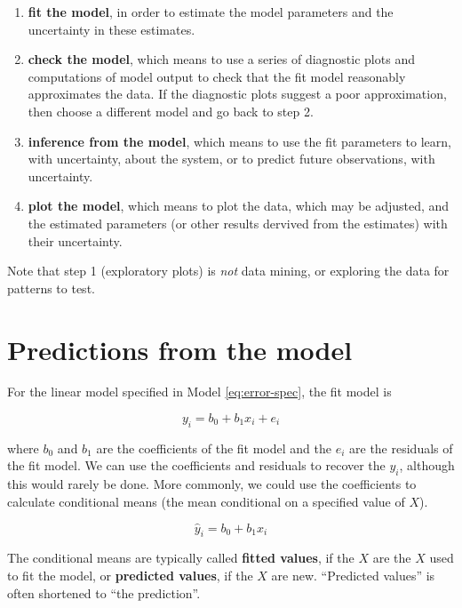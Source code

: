 \documentclass[]{book}
\providecommand{\tightlist}{%
  \setlength{\itemsep}{0pt}\setlength{\parskip}{0pt}}
\begin{document}
\begin{enumerate}
\def\labelenumi{\arabic{enumi}.}
\setcounter{enumi}{1}
\tightlist
\item
  \textbf{fit the model}, in order to estimate the model parameters and the uncertainty in these estimates.
\item
  \textbf{check the model}, which means to use a series of diagnostic plots and computations of model output to check that the fit model reasonably approximates the data. If the diagnostic plots suggest a poor approximation, then choose a different model and go back to step 2.
\item
  \textbf{inference from the model}, which means to use the fit parameters to learn, with uncertainty, about the system, or to predict future observations, with uncertainty.
\item
  \textbf{plot the model}, which means to plot the data, which may be adjusted, and the estimated parameters (or other results dervived from the estimates) with their uncertainty.
\end{enumerate}

Note that step 1 (exploratory plots) is \emph{not} data mining, or exploring the data for patterns to test.

\hypertarget{predictions-from-the-model}{%
\section{Predictions from the model}\label{predictions-from-the-model}}

For the linear model specified in Model \eqref{eq:error-spec}, the fit model is

\begin{equation}
y_i = b_0 + b_1 x_i + e_i
\label{eq:y-i}
\end{equation}

where \(b_0\) and \(b_1\) are the coefficients of the fit model and the \(e_i\) are the residuals of the fit model. We can use the coefficients and residuals to recover the \(y_i\), although this would rarely be done. More commonly, we could use the coefficients to calculate conditional means (the mean conditional on a specified value of \(X\)).

\begin{equation}
\hat{y}_i = b_0 + b_1 x_i
\label{eq:yhat}
\end{equation}

The conditional means are typically called \textbf{fitted values}, if the \(X\) are the \(X\) used to fit the model, or \textbf{predicted values}, if the \(X\) are new. ``Predicted values'' is often shortened to ``the prediction''.
\end{document}
